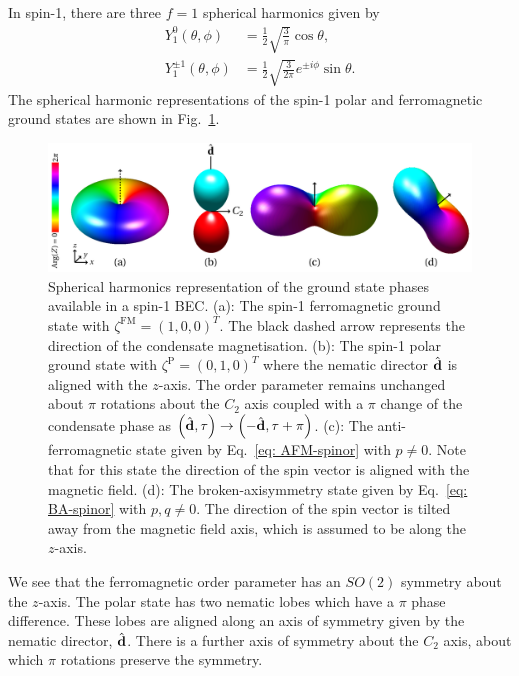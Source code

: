 In spin-1, there are three \(f = 1\) spherical harmonics given by
\begin{align}
    Y_1^0(\theta, \phi)       & = \frac{1}{2}\sqrt{\frac{3}{\pi}}\cos\theta, \\
    Y_1^{\pm 1}(\theta, \phi) & =
    \frac{1}{2}\sqrt{\frac{3}{2\pi}}e^{\pm i \phi}\sin\theta.
\end{align}
The spherical harmonic representations of the spin-1 polar and ferromagnetic
ground states are shown in Fig.~\ref{fig: spin-1-spherical-harmonics}.
\begin{figure}
    \includegraphics[width=\textwidth]
    {gfx/ch-groundStateSymmetries/spin-1-ground-states.pdf}
    \caption[Spherical harmonic representation of spin-1 ground states]
    {\label{fig: spin-1-spherical-harmonics}
    Spherical harmonics representation of the ground state phases available in a
    spin-1 BEC.\@
    (a): The spin-1 ferromagnetic ground state with
    \(\zeta^\mathrm{FM}={(1, 0, 0)}^T\).
    The black dashed arrow represents the direction of the condensate
    magnetisation.
    (b): The spin-1 polar ground state with
    \(\zeta^\mathrm{P}={(0, 1, 0)}^T\) where the nematic director
    \(\hat{\vb{d}}\) is aligned with the \(z\)-axis.
    The order parameter remains unchanged about \(\pi \) rotations about the
    \(C_2\) axis coupled with a \(\pi \) change of the condensate phase as
    \(\left(\hat{\vb{d}}, \tau\right) \rightarrow
    \left(-\hat{\vb{d}}, \tau+\pi\right)\).
    (c): The anti-ferromagnetic state given by Eq.~\eqref{eq: AFM-spinor} with
    \(p \neq 0\).
    Note that for this state the direction of the spin vector is aligned with
    the magnetic field.
    (d): The broken-axisymmetry state given by Eq.~\eqref{eq: BA-spinor} with
    \(p, q \neq 0\).
    The direction of the spin vector is tilted away from the magnetic field
    axis, which is assumed to be along the \(z\)-axis.}
\end{figure}
We see that the ferromagnetic order parameter has an \(SO(2)\) symmetry about
the \(z\)-axis.
The polar state has two nematic lobes which have a \(\pi \) phase difference.
These lobes are aligned along an axis of symmetry given by the nematic director,
\(\hat{\vb{d}}\).
There is a further axis of symmetry about the \(C_2\) axis, about which \(\pi \)
rotations preserve the symmetry.

